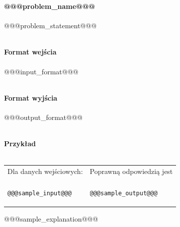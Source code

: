 \documentclass[
  fontsize=12pt  %
 ,english        %
 ,headinclude    %
 ,headsepline    %
]{scrbook}       %
\begin{document}
\vspace{50 mm}
\hspace{50 mm}
\newline

\par{\Large \textbf{@@@problem_name@@@}} \\ \\
@@@problem_statement@@@
\\ \\
\par{\Large \textbf{Format wejścia}} \\ \\
@@@input_format@@@
\\ \\
\par{\Large \textbf{Format wyjścia}} \\ \\
@@@output_format@@@
\\ \\
\par{\Large \textbf{Przykład}} \\ \\
\begin{tabular}{ p{7cm} p{7cm} }
	Dla danych wejściowych: \hspace{40mm}& Poprawną odpowiedzią jest \\
& \\

\begin{verbatim}@@@sample_input@@@\end{verbatim}
&   
\begin{verbatim}@@@sample_output@@@\end{verbatim}
\\

\end{tabular}

@@@sample_explanation@@@
\end{document}

